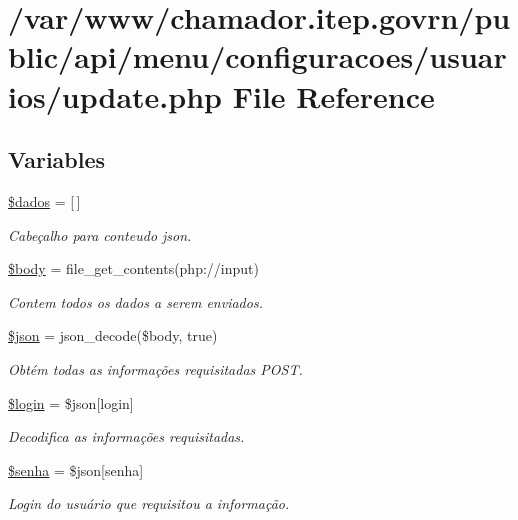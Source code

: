 \hypertarget{usuarios_2update_8php}{}\section{/var/www/chamador.itep.\+govrn/public/api/menu/configuracoes/usuarios/update.php File Reference}
\label{usuarios_2update_8php}
\subsection*{Variables}
\begin{DoxyCompactItemize}
\item 
\hyperlink{usuarios_2update_8php_a252370d95039a38fa11afab784725d58}{\$dados} = \mbox{[}$\,$\mbox{]}
\begin{DoxyCompactList}\small\item\em Cabeçalho para conteudo json. \end{DoxyCompactList}\item 
\hyperlink{usuarios_2update_8php_a26b9f9373f7bb79dfcf8a86dff086b45}{\$body} = file\+\_\+get\+\_\+contents(\textquotesingle{}php\+://input\textquotesingle{})
\begin{DoxyCompactList}\small\item\em Contem todos os dados a serem enviados. \end{DoxyCompactList}\item 
\hyperlink{usuarios_2update_8php_acedd13b51401130848ce18f4d5c52605}{\$json} = json\+\_\+decode(\$body, true)
\begin{DoxyCompactList}\small\item\em Obtém todas as informações requisitadas P\+O\+ST. \end{DoxyCompactList}\item 
\hyperlink{usuarios_2update_8php_afc31993e855f9631572adfedcfe6f34b}{\$login} = \$json\mbox{[}\textquotesingle{}login\textquotesingle{}\mbox{]}
\begin{DoxyCompactList}\small\item\em Decodifica as informações requisitadas. \end{DoxyCompactList}\item 
\hyperlink{usuarios_2update_8php_a3678c8769c9698fd30581c1016c5f475}{\$senha} = \$json\mbox{[}\textquotesingle{}senha\textquotesingle{}\mbox{]}
\begin{DoxyCompactList}\small\item\em Login do usuário que requisitou a informação. \end{DoxyCompactList}\item 

\end{DoxyCompactItemize}
